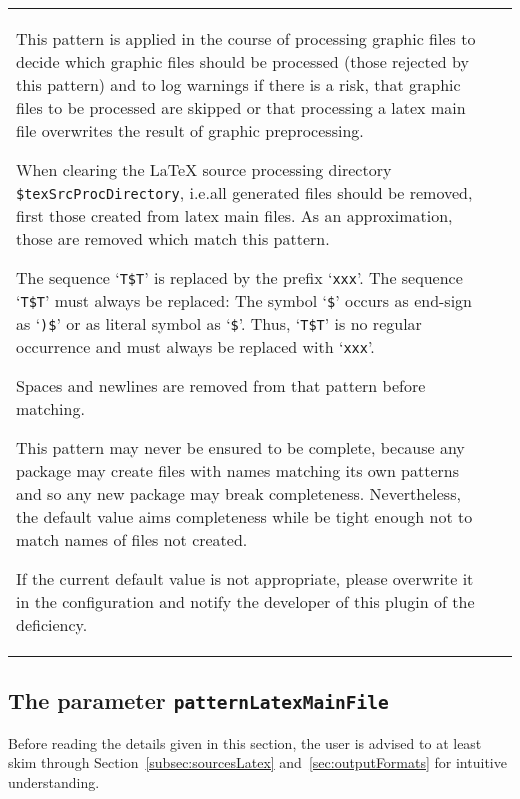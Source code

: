 \begin{longtable}{|ll|}
{\begin{minipage}{0.95\linewidth}
This pattern is applied 
in the course of processing graphic files 
to decide which graphic files should be processed 
(those rejected by this pattern) 
and to log warnings if there is a risk, 
that graphic files to be processed 
are skipped or that processing a latex main file overwrites 
the result of graphic preprocessing. 

When clearing the \LaTeX{} source processing directory 
\texttt{\$texSrcProcDirectory}, 
i.e.\@ all generated files should be removed, 
first those created from latex main files. 
As an approximation, 
those are removed which match this pattern. 

The sequence `\texttt{T\$T}' 
is replaced by the prefix `\texttt{xxx}'. 
The sequence `\texttt{T\$T}' must always be replaced: 
The symbol `\texttt{\$}' occurs as end-sign as `\texttt{)\$}' %
or as literal symbol as `\texttt{\$}'. 
Thus, `\texttt{T\$T}' is no regular occurrence 
and must always be replaced with `\texttt{xxx}'. 
		 
Spaces and newlines are removed 
from that pattern before matching. 

This pattern may never be ensured to be complete, 
because any package 
may create files with names matching its own patterns 
and so any new package may break completeness. 
Nevertheless, the default value aims completeness 
while be tight enough not to match names of files not created. 

If the current default value is not appropriate, 
please overwrite it in the configuration 
and notify the developer of this plugin of the deficiency. 
\end{minipage}
} \\ %
\end{longtable}


\subsection{The parameter \texttt{patternLatexMainFile}}%
\label{subsec:patternLatexMainFile}

Before reading the details given in this section, 
the user is advised to at least skim 
through Section~\ref{subsec:sourcesLatex} and~\ref{sec:outputFormats} 
for intuitive understanding. 

